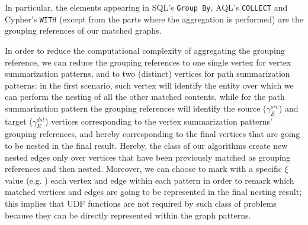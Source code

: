 In particular, the elements appearing in SQL's \texttt{Group By}, AQL's \texttt{COLLECT} and Cypher's \texttt{WITH} (except from the parts where the aggregation is performed) are the grouping references of our matched graphs.

In order to reduce the computational complexity of aggregating the grouping reference, we can reduce the grouping references to one single vertex for vertex summarization patterns, and to two (distinct) vertices for path summarization patterns: in the first scenario, such vertex will identify the entity over which we can perform the nesting of all the other matched contents, while for the path summarization pattern the grouping references will identify the source ($\gamma_E^{src}$) and target ($\gamma_E^{dst}$) vertices corresponding to the vertex summarization patterns' grouping references, and hereby corresponding to the final vertices that are going to be nested in the final result. Hereby, the class of our algorithms create new nested edges only over vertices that have been previously matched as grouping references and then nested. Moreover, we can choose to mark with a specific $\xi$ value (e.g. ) each vertex and edge within each pattern in order to remark which matched vertices and edges are going to be represented in the final nesting result; this implies that UDF functions are not required by such class of problems because they can be directly represented within the graph patterns.



